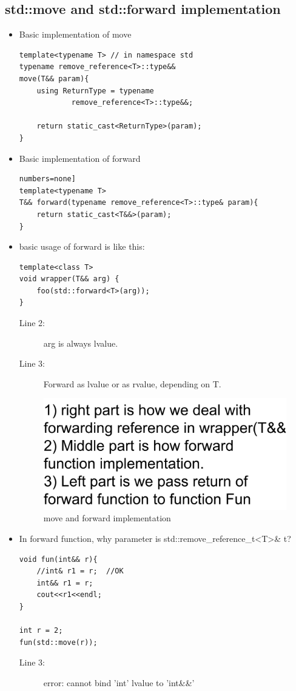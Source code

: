 \documentclass[a4paper,11pt,twoside]{book}
\begin{document}
\subsection{std::move and std::forward implementation}
\begin{itemize}
	\item Basic implementation of move
\begin{lstlisting}[numbers=none]
template<typename T> // in namespace std
typename remove_reference<T>::type&&
move(T&& param){
	using ReturnType = typename 
			remove_reference<T>::type&&; 
			
	return static_cast<ReturnType>(param);
}
\end{lstlisting}
	
	\item Basic implementation of forward
\begin{lstlisting}numbers=none]
template<typename T>
T&& forward(typename remove_reference<T>::type& param){
	return static_cast<T&&>(param);
}
\end{lstlisting}

	\item basic usage of forward is like this:
\begin{lstlisting}
template<class T>
void wrapper(T&& arg) {
	foo(std::forward<T>(arg)); 
}
\end{lstlisting}
\begin{description}
	\item[Line 2:] arg is always lvalue.
	\item[Line 3:] Forward as lvalue or as rvalue, depending on T.
	
	
\end{description}
	\begin{figure}
		\centering
		\includegraphics[width=0.8\linewidth]{pics/rvalue_ref.png}
		\caption{move and forward implementation}
		\label{fig:rvalueref}
	\end{figure}

	\item In forward function, why parameter is std::remove\_reference\_t<T>\& t?
\begin{lstlisting}
void fun(int&& r){
	//int& r1 = r;  //OK
	int&& r1 = r;  
	cout<<r1<<endl;
}

int r = 2;
fun(std::move(r));
\end{lstlisting}
\begin{description}
	\item[Line 3:] error: cannot bind 'int' lvalue to 'int\&\&'
\end{description}

\end{itemize}
\end{document}
